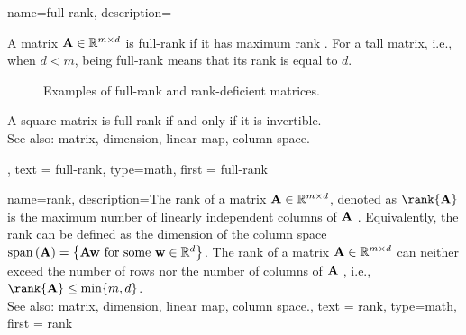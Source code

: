  {name={full-rank},
  description={A matrix ${\bf A} \in \mathbb{R}^{m \times d}$ 
  is full-rank if it has maximum rank \cite{StrangLinAlg2016}. 
  For a tall matrix, i.e., when $d < m$, being 
  full-rank means that its rank is equal to $d$. 
 \begin{figure}[H]
\centering
{}
\caption{Examples of full-rank and rank-deficient matrices.}
\end{figure} 
  A square matrix is full-rank if and 
  only if it is invertible. \\ 
  See also: matrix, dimension, linear map, column space.}, 
  text = {full-rank}, 
  type=math,
  first = {full-rank} 
 }

{name={rank},
 description={The rank of a matrix ${\bf A} \in \mathbb{R}^{m \times d}$, 
 denoted as $\rank{{\bf A}}$ is the maximum number of linearly independent columns 
 of ${\bf A}$ \cite{StrangLinAlg2016}. Equivalently, the rank can be defined as the 
 dimension of the column space ${\rm span}\left({\bf A} \right) = \big\{ {\bf A} {\bf w} \mbox{ for some } 
 {\bf w} \in \mathbb{R}^{d} \big\}$. The rank of a matrix 
 ${\bf A} \in \mathbb{R}^{m \times d}$ can neither exceed the 
 number of rows nor the number of columns of ${\bf A}$ \cite{Horn91,MeyerMatrixAnalysis}, i.e., $\rank{{\bf A}} \leq \min \{ m, d \}$.   \\ 
 See also: matrix, dimension, linear map, column space.}, 
text = {rank}, 
type=math,
first = {rank} 
}

